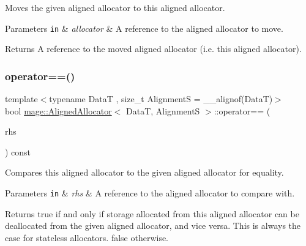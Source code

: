 Moves the given aligned allocator to this aligned allocator.


\begin{DoxyParams}[1]{Parameters}
\mbox{\tt in}  & {\em allocator} & A reference to the aligned allocator to move. \\
\hline
\end{DoxyParams}
\begin{DoxyReturn}{Returns}
A reference to the moved aligned allocator (i.\+e. this aligned allocator). 
\end{DoxyReturn}
\hypertarget{structmage_1_1_aligned_allocator_a5abdcdde596e62320252b40bf93412d2}{}\label{structmage_1_1_aligned_allocator_a5abdcdde596e62320252b40bf93412d2} 
\subsubsection{\texorpdfstring{operator==()}{operator==()}}
{\footnotesize\ttfamily template$<$typename DataT , size\+\_\+t AlignmentS = \+\_\+\+\_\+alignof(\+Data\+T)$>$ \\
bool \hyperlink{structmage_1_1_aligned_allocator}{mage\+::\+Aligned\+Allocator}$<$ DataT, AlignmentS $>$\+::operator== (\begin{DoxyParamCaption}\item[{const \hyperlink{structmage_1_1_aligned_allocator}{Aligned\+Allocator}$<$ DataT, AlignmentS $>$ \&}]{rhs }\end{DoxyParamCaption}) const\hspace{0.3cm}{\ttfamily [noexcept]}}

Compares this aligned allocator to the given aligned allocator for equality.


\begin{DoxyParams}[1]{Parameters}
\mbox{\tt in}  & {\em rhs} & A reference to the aligned allocator to compare with. \\
\hline
\end{DoxyParams}
\begin{DoxyReturn}{Returns}
{\ttfamily true} if and only if storage allocated from this aligned allocator can be deallocated from the given aligned allocator, and vice versa. This is always the case for stateless allocators. {\ttfamily false} otherwise. 
\end{DoxyReturn}

